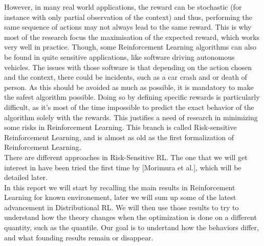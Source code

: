 However, in many real world applications, the reward can be stochastic (for instance with only partial observation of the context) and thus, performing the same sequence of actions may not always lead to the same reward. This is why most of the research focus the maximisation of the expected reward, which works very well in practice.
Though, some Reinforcement Learning algorithms can also be found in quite sensitive applications, like software driving autonomous vehicles. The issues with those software is that depending on the action chosen and the context, there could be incidents, such as a car crash and or death of person. As this should be avoided as much as possible, it is mandatory to make the safest algorithm possible. Doing so by defining specific rewards is particularly difficult, as it’s most of the time impossible to predict the exact behavior of the algorithm solely with the rewards. This justifies a need of research in minimizing some risks in Reinforcement Learning. This branch is called Risk-sensitive Reinforcement Learning, and is almost as old as the first formalization of Reinforcement Learning.
\\%

There are different approaches in Risk-Sensitive RL. The one that we will get interest in have been tried the first time by \cite{morimura_parametric_2012}[Morimura et al.], which will be detailed later.
\\

In this report we will start by recalling the main results in Reinforcement Learning for known environement, later we will sum up some of the latest advancement in Distributional RL. We will then use those results to try to understand how the theory changes when the optimization is done on a different quantity, such as the quantile. Our goal is to undertand how the behaviors differ, and what founding results remain or disappear.
